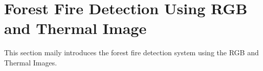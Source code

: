 \section{Forest Fire Detection Using RGB and Thermal Image}
This section maily introduces the forest fire detection
system using the RGB and Thermal Images.
